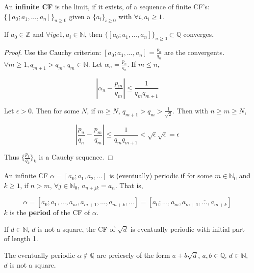 \begin{definition}
	An \textbf{infinite CF} is the limit, if it exists, of a sequence of finite CF's: $\{[a_0; a_1, \ldots, a_n]\}_{n \ge 0}$ given a $\{a_i\}_{i \ge 0}$ with $\forall i, a_i \ge 1$.
\end{definition}

\begin{proposition}
	If $a_0 \in \mathbb{Z}$ and $\forall i ge 1, a_i \in \mathbb{N}$, then $\{[a_0; a_1, \ldots, a_n]\}_{n \ge 0} \subset \mathbb{Q}$ converges.
\end{proposition}

\begin{proof}
	Use the Cauchy criterion: $[a_0; a_1, \ldots, a_n] = \frac{p_n}{q_n}$ are the convergents. $\forall m \ge 1, q_{m + 1} > q_m$, $q_m \in \mathbb{N}$. Let $\alpha_n = \frac{p_n}{q_n}$. If $m \le n$,

	\[ \left| \alpha_n - \frac{p_m}{q_m} \right| \le \frac{1}{q_m q_{m + 1}} \]

	Let $\epsilon > 0$. Then for some $N$, if $m \ge N$, $q_{m + 1} > q_m > \frac{1}{\sqrt{2}}$. Then with $n \ge m \ge N$,

	\[ \left| \frac{p_n}{q_n} - \frac{p_m}{q_m} \right| \le \frac{1}{q_m q_{m + 1}} < \sqrt{\epsilon} \sqrt{\epsilon} = \epsilon \]

	Thus $\{ \frac{p_k}{q_k} \}_k$ is a Cauchy sequence.
\end{proof}

\begin{definition}
	An infinite CF $\alpha = [a_0; a_1, a_2, \ldots]$ is (eventually) periodic if for some $m \in \mathbb{N}_0$ and $k \ge 1$, if $n > m$, $\forall j \in \mathbb{N}_0$, $a_{n + jk} = a_n$. That is,

	\[ \alpha = [a_0; a_1, \ldots, a_m, a_{m + 1}, \ldots, a_{m + k}, \ldots] = [a_0; \ldots, a_m, \overline{a_{m + 1}, \ldots, a_{m + k}}] \]
	$k$ is the \textbf{period} of the CF of $\alpha$.
\end{definition}

\begin{lemma}
	If $d \in \mathbb{N}$, $d$ is not a square, the CF of $\sqrt{d}$ is eventually periodic with initial part of length 1.
\end{lemma}

\begin{theorem}
	The eventually periodic $\alpha \notin \mathbb{Q}$ are preicsely of the form $a + b \sqrt{d}$, $a, b \in \mathbb{Q}$, $d \in \mathbb{N}$, $d$ is not a square.
\end{theorem}

